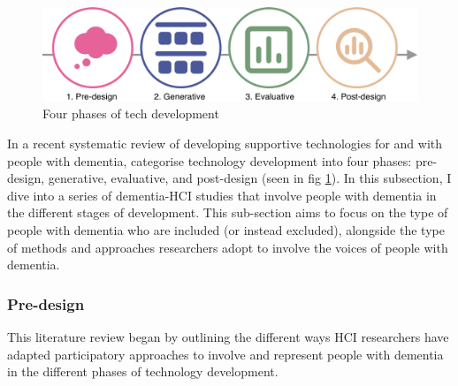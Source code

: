 \begin{figure}[htp]
    \centering
    \includegraphics[width=0.8\linewidth]{Images/ChapterTwo/PhasesOfTech.png}
    \caption{Four phases of tech development \citep{suijkerbuijk_active_2019}}
    \label{fig:PhasesOfTech}
\end{figure}
In a recent systematic review of developing supportive technologies for and with people with dementia, \cite{suijkerbuijk_active_2019} categorise technology development into four phases: pre-design, generative, evaluative, and post-design (seen in fig \ref{fig:PhasesOfTech}). In this subsection, I dive into a series of dementia-HCI studies that involve people with dementia in the different stages of development. This sub-section aims to focus on the type of people with dementia who are included (or instead excluded), alongside the type of methods and approaches researchers adopt to involve the voices of people with dementia.

\subsubsection{Pre-design}
\label{BL:Pre-Design}
This literature review began by outlining the different ways HCI researchers have adapted participatory approaches to involve and represent people with dementia in the different phases of technology development. 

